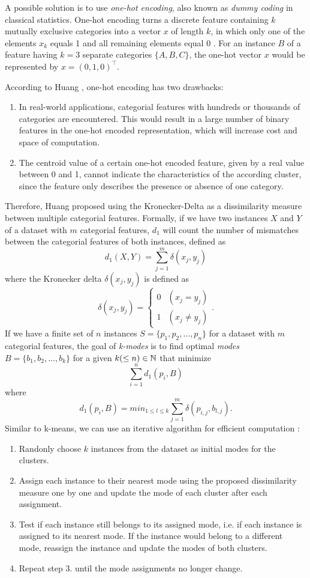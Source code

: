 A possible solution is to use \textit{one-hot encoding}, also known as \textit{dummy coding} in classical statistics. One-hot encoding turns a discrete feature containing $k$ mutually exclusive categories into a vector $x$ of length $k$, in which only one of the elements $x_k$ equals 1 and all remaining elements equal 0 \cite{pattern_recognition_machine_learning}. For an instance $B$ of a feature having $k=3$ separate categories $\{A, B, C\}$, the one-hot vector $x$ would be represented by $x = (0, 1, 0)^{\intercal}$.

According to Huang \cite{kmodes}, one-hot encoding has two drawbacks:
\begin{enumerate} 
	\item In real-world applications, categorial features with hundreds or thousands of categories are encountered. This would result in a large number of binary features in the one-hot encoded representation, which will increase cost and space of computation.
	\item The centroid value of a certain one-hot encoded feature, given by a real value between 0 and 1, cannot indicate the characteristics of the according cluster, since the feature only describes the presence or absence of one category.
\end{enumerate}
Therefore, Huang \cite{kmodes} proposed using the Kronecker-Delta as a dissimilarity measure between multiple categorial features. Formally, if we have two instances $X$ and $Y$ of a dataset with $m$ categorial features, $d_1$ will count the number of mismatches between the categorial features of both instances, defined as
$$d_1(X, Y) = \sum^m_{j=1} \delta (x_j, y_j)$$
where the Kronecker delta $\delta (x_j, y_j)$ is defined as
$$\delta (x_j, y_j) = 
\begin{cases}
    0 & (x_j = y_j)\\
    1 & (x_j \neq y_j)
\end{cases}.
$$
If we have a finite set of $n$ instances $S=\{p_1, p_2, ..., p_n\}$ for a dataset with $m$ categorial features, the goal of \textit{k-modes} \cite{kmodes} is to find optimal \textit{modes} $B=\{b_1, b_2, ..., b_k\}$ for a given $k (\leq n) \in \mathbb{N}$ that minimize
$$\sum_{i=1}^n  d_1(p_i, B)$$
where
$$d_1(p_i, B) = min_{1 \leq l \leq k} \sum^m_{j=1} \delta (p_{i,j}, b_{l,j}).$$
Similar to k-means, we can use an iterative algorithm for efficient computation \cite{kmodes}:
\begin{enumerate} 
	\item Randonly choose $k$ instances from the dataset as initial modes for the clusters.
	\item Assign each instance to their nearest mode using the proposed dissimilarity measure one by one and update the mode of each cluster after each assignment.
	\item Test if each instance still belongs to its assigned mode, i.e. if each instance is assigned to its nearest mode. If the instance would belong to a different mode, reassign the instance and update the modes of both clusters.
	\item Repeat step 3. until the mode assignments no longer change.
\end{enumerate}

